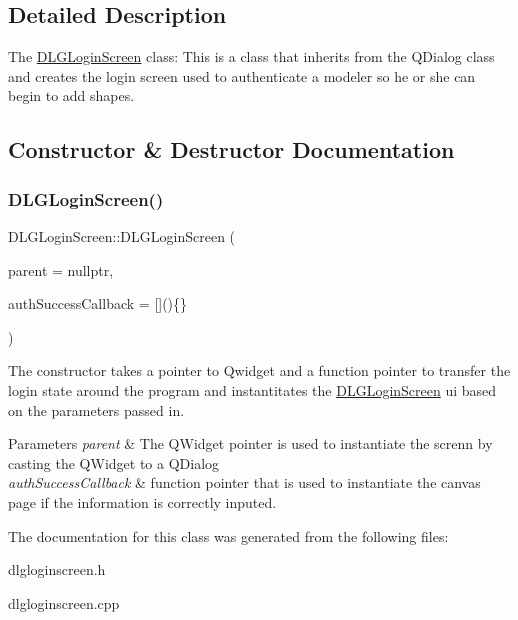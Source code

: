 \subsection{Detailed Description}
The \mbox{\hyperlink{class_d_l_g_login_screen}{D\+L\+G\+Login\+Screen}} class\+: This is a class that inherits from the Q\+Dialog class and creates the login screen used to authenticate a modeler so he or she can begin to add shapes. 

\subsection{Constructor \& Destructor Documentation}
\mbox{\label{class_d_l_g_login_screen_aabc315a7cca94bcccf1965a5dd2d6dd4}} 
\subsubsection{\texorpdfstring{DLGLoginScreen()}{DLGLoginScreen()}}
{\footnotesize\ttfamily D\+L\+G\+Login\+Screen\+::\+D\+L\+G\+Login\+Screen (\begin{DoxyParamCaption}\item[{Q\+Widget $\ast$}]{parent = {\ttfamily nullptr},  }\item[{std\+::function$<$ void()$>$}]{auth\+Success\+Callback = {\ttfamily \mbox{[}\mbox{]}()\{\}} }\end{DoxyParamCaption})\hspace{0.3cm}{\ttfamily [explicit]}}



The constructor takes a pointer to Qwidget and a function pointer to transfer the login state around the program and instantitates the \mbox{\hyperlink{class_d_l_g_login_screen}{D\+L\+G\+Login\+Screen}} ui based on the parameters passed in. 


\begin{DoxyParams}{Parameters}
{\em parent} & The Q\+Widget pointer is used to instantiate the screnn by casting the Q\+Widget to a Q\+Dialog \\
\hline
{\em auth\+Success\+Callback} & function pointer that is used to instantiate the canvas page if the information is correctly inputed. \\
\hline
\end{DoxyParams}


The documentation for this class was generated from the following files\+:\begin{DoxyCompactItemize}
\item 
dlgloginscreen.\+h\item 
dlgloginscreen.\+cpp\end{DoxyCompactItemize}
